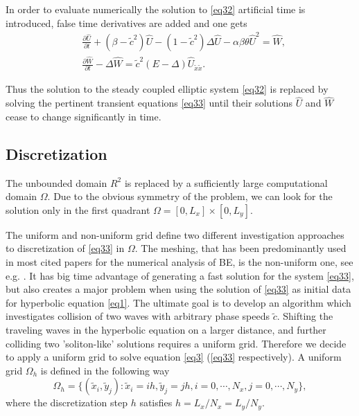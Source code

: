 \documentclass[12pt]{article}
\theoremstyle{theorem}
\theoremstyle{defi}
\begin{document}
In order to evaluate numerically the solution to \eqref{eq32} artificial time is introduced, false time derivatives are added and one gets
\begin{equation}\label{eq33}
\begin{split}
&\frac {\partial \widehat{U}}{\partial t} + (\beta-\tilde c^2) \widehat{U} - (1-\tilde c^2 ) \Delta \widehat{U} - \alpha \beta \theta \widehat{U}^2 = \widehat{W}, \\
&\frac {\partial \widehat{W}}{\partial t} - \Delta \widehat{W} =\tilde c^2 (E- \Delta) \widehat{U}_{\tilde x \tilde x}.
\end{split}
\end{equation}

Thus the solution to the steady coupled elliptic system \eqref{eq32} is replaced by solving the pertinent transient equations \eqref{eq33} until their solutions $\widehat{U}$ and $\widehat{W}$ cease to change significantly in time.

\subsection{Discretization}

The unbounded domain $R^2$ is replaced by a sufficiently large computational domain $\Omega$. Due to the obvious symmetry of the problem, we can look for the solution only in the first quadrant $\Omega = [0,L_x] \times[0,L_y]$.

The uniform and non-uniform grid define two different investigation approaches to discretization of \eqref{eq33} in $\Omega$. The meshing, that has been predominantly used in most cited papers for the numerical analysis of BE, is the non-uniform one, see e.g. \cite{ref6}. It has big time advantage of generating a fast solution for the system \eqref{eq33}, but also creates a major problem when using the solution of \eqref{eq33} as initial data for hyperbolic equation \eqref{eq1}. The ultimate goal is to develop an algorithm which investigates collision of two waves with arbitrary phase speeds $\tilde c$. Shifting the traveling waves in the hyperbolic equation on a larger distance, and further colliding two 'soliton-like' solutions requires a uniform grid. Therefore we decide to apply a uniform grid to solve equation \eqref{eq3} (\eqref{eq33} respectively).
A uniform grid $\Omega_h$ is defined in the following way
$$
\Omega_h = \{(\tilde x_i, \tilde y_j): \tilde x_i = ih, \tilde y_j = jh, i = 0,\cdots ,N_x, j = 0,\cdots , N_y \},
$$
where the discretization step $h$ satisfies
$ h = L_x/N_x = L_y/N_y$.
\end{document}
